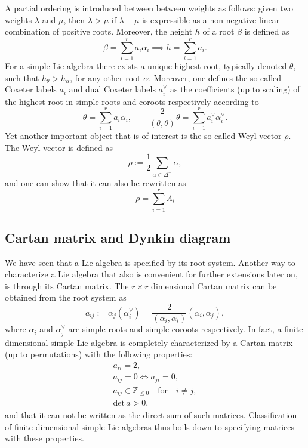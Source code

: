 A partial ordering is introduced between between weights as follows: given two weights $\lambda$ and $\mu$, then $\lambda>\mu$ if $\lambda-\mu$ is expressible as a non-negative linear combination of positive roots. Moreover, the height $h$ of a root $\beta$ is defined as 
\begin{equation}
    \beta = \sum_{i=1}^ra_i\alpha_i\implies h = \sum_{i=1}^r a_i.
\end{equation}
For a simple Lie algebra there exists a unique highest root, typically denoted $\theta$, such that $h_\theta>h_\alpha$, for any other root $\alpha$. Moreover, one defines the so-called Coxeter labels $a_i$ and dual Coxeter labels $a_i^\vee$ as the coefficients (up to scaling) of the highest root in simple roots and coroots respectively according to
\begin{equation}\label{eq:HighestRoot}
    \theta = \sum_{i=1}^ra_i\alpha_{i},\qquad \frac{2}{(\theta,\theta)}\theta = \sum_{i=1}^r a_i^\vee \alpha_{i}^{\vee}.
\end{equation}
Yet another important object that is of interest is the so-called Weyl vector $\rho$. The Weyl vector is defined as
\begin{equation}\label{eq:Weylroots}
    \rho := \frac{1}{2}\sum_{\alpha\in\Delta^+}\alpha,
\end{equation}
and one can show that it can also be rewritten as
\begin{equation}
        \rho = \sum_{i=1}^r \Lambda_{i}
\end{equation}

\subsection{Cartan matrix and Dynkin diagram}
We have seen that a Lie algebra is specified by its root system. Another way to characterize a Lie algebra that also is convenient for further extensions later on, is through its Cartan matrix. The $r\times r$ dimensional Cartan matrix can be obtained from the root system as
\begin{equation}\label{eq:CartanFirst}
    a_{ij} := \alpha_j(\alpha_{i}^\vee)  = \frac{2}{(\alpha_{i},\alpha_{i})}(\alpha_{i},\alpha_{j}),
\end{equation}
where $\alpha_{i}$ and $\alpha_{j}^{\vee}$ are simple roots and simple coroots respectively. In fact, a finite dimensional simple Lie algebra is completely characterized by a Cartan matrix (up to permutations) with the following properties:
\begin{equation}\label{eq:Cartanprop}
    \begin{aligned}
        a_{ii} = 2,\\
        a_{ij} = 0 \Longleftrightarrow a_{ji} = 0,\\
        a_{ij}\in \mathbb{Z}_{\leq 0} \quad\text{for}\quad i\neq j,\\
        \text{det}\, a >0,
    \end{aligned}
\end{equation}
and that it can not be written as the direct sum of such matrices. Classification of finite-dimensional simple Lie algebras thus boils down to specifying matrices with these properties. 

